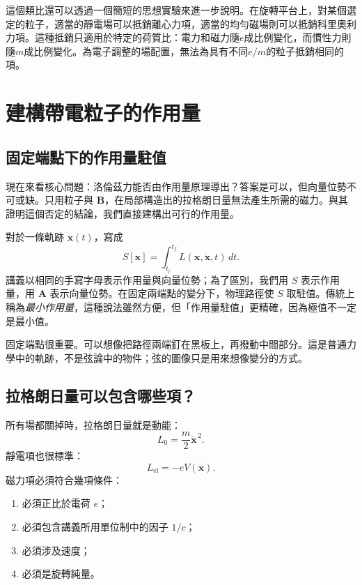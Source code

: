 這個類比還可以透過一個簡短的思想實驗來進一步說明。在旋轉平台上，對某個選定的粒子，適當的靜電場可以抵銷離心力項，適當的均勻磁場則可以抵銷科里奧利力項。這種抵銷只適用於特定的荷質比：電力和磁力隨\(e\)成比例變化，而慣性力則隨\(m\)成比例變化。為電子調整的場配置，無法為具有不同\(e/m\)的粒子抵銷相同的項。

\section{建構帶電粒子的作用量}

\subsection{固定端點下的作用量駐值}

現在來看核心問題：洛倫茲力能否由作用量原理導出？答案是可以，但向量位勢不可或缺。只用粒子與 \(\mathbf B\)，在局部構造出的拉格朗日量無法產生所需的磁力。與其證明這個否定的結論，我們直接建構出可行的作用量。

對於一條軌跡 \(\mathbf x(t)\)，寫成
\begin{equation}
  S[\mathbf x]
  =
  \int_{t_i}^{t_f}L(\mathbf x,\dot{\mathbf x},t)\,dt.
\end{equation}
講義以相同的手寫字母表示作用量與向量位勢；為了區別，我們用 \(S\) 表示作用量，用 \(\mathbf A\) 表示向量位勢。在固定兩端點的變分下，物理路徑使 \(S\) 取駐值。傳統上稱為\emph{最小作用量}，這種說法雖然方便，但「作用量駐值」更精確，因為極值不一定是最小值。

固定端點很重要。可以想像把路徑兩端釘在黑板上，再撥動中間部分。這是普通力學中的軌跡，不是弦論中的物件；弦的圖像只是用來想像變分的方式。

\subsection{拉格朗日量可以包含哪些項？}

所有場都關掉時，拉格朗日量就是動能：
\begin{equation}
  L_0=\frac{m}{2}\dot{\mathbf x}^{\,2}.
\end{equation}
靜電項也很標準：
\begin{equation}
  L_{\mathrm{el}}=-eV(\mathbf x).
\end{equation}
磁力項必須符合幾項條件：
\begin{enumerate}
  \item 必須正比於電荷 \(e\)；
  \item 必須包含講義所用單位制中的因子 \(1/c\)；
  \item 必須涉及速度；
  \item 必須是旋轉純量。
\end{enumerate}

